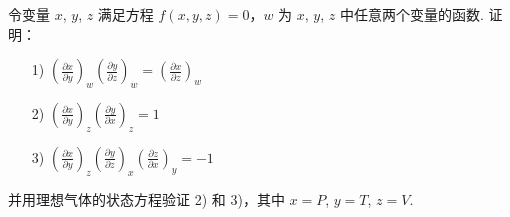 \documentclass{assignment}
\begin{document}
\begin{prob}
    令变量 $x$, $y$, $z$ 满足方程 $f(x,y,z)=0$，$w$ 为 $x$, $y$, $z$ 中任意两个变量的函数. 证明：
    \begin{itemize}
        \item[1)] $\left(\frac{\partial x}{\partial y}\right)_w\left(\frac{\partial y}{\partial z}\right)_w=\left(\frac{\partial x}{\partial z}\right)_w$
        \item[2)] $\left(\frac{\partial x}{\partial y}\right)_z\left(\frac{\partial y}{\partial x}\right)_z=1$
        \item[3)] $\left(\frac{\partial x}{\partial y}\right)_z\left(\frac{\partial y}{\partial z}\right)_x\left(\frac{\partial z}{\partial x}\right)_y=-1$
    \end{itemize}
    并用理想气体的状态方程验证 2) 和 3)，其中 $x=P$, $y=T$, $z=V$.
\end{prob}
\end{document}
